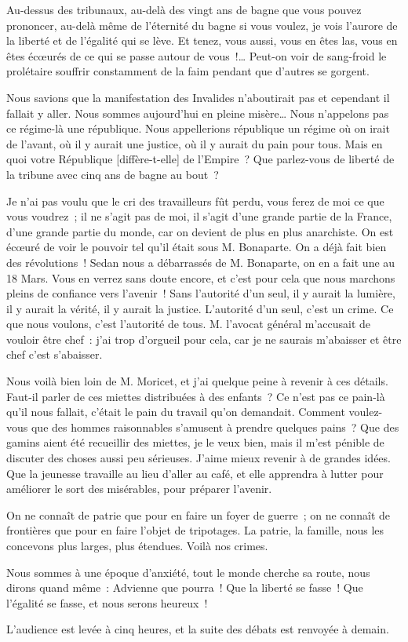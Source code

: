 \documentclass[french,twoside]{book} %
\newcommand\corr[1]{#1}
\begin{document}
Au-dessus des tribunaux, au-delà des vingt ans de bagne que vous pouvez prononcer, au-delà même de l’éternité du bagne si vous voulez, je vois l’aurore de la liberté et de l’égalité qui se lève. Et tenez, vous aussi, vous en êtes las, vous en êtes écœurés de ce qui se passe autour de vous !… Peut-on voir de sang-froid le prolétaire souffrir constamment de la faim pendant que d’autres se gorgent.\par
Nous savions que la manifestation des Invalides n’aboutirait pas et cependant il fallait y aller. Nous sommes aujourd’hui en pleine misère… Nous n’appelons pas ce régime-là une république. Nous appellerions république un régime où on irait de l’avant, où il y aurait une justice, où il y aurait du pain pour tous. Mais en quoi votre République [{\corr diffère-t-elle}] de l’Empire ? Que parlez-vous de liberté de la tribune avec cinq ans de bagne au bout ?\par
Je n’ai pas voulu que le cri des travailleurs fût perdu, vous ferez de moi ce que vous voudrez ; il ne s’agit pas de moi, il s’agit d’une grande partie de la France, d’une grande partie du monde, car on devient de plus en plus anarchiste. On est écœuré de voir le pouvoir tel qu’il était sous M. Bonaparte. On a déjà fait bien des révolutions ! Sedan nous a débarrassés de M. Bonaparte, on en a fait une au 18 Mars. Vous en verrez sans doute encore, et c’est pour cela que nous marchons pleins de confiance vers l’avenir ! Sans l’autorité d’un seul, il y aurait la lumière, il y aurait la vérité, il y aurait la justice. L’autorité d’un seul, c’est un crime. Ce que nous voulons, c’est l’autorité de tous. M. l’avocat général m’accusait de vouloir être chef : j’ai trop d’orgueil pour cela, car je ne saurais m’abaisser et être chef c’est s’abaisser.\par
 Nous voilà bien loin de M. Moricet, et j’ai quelque peine à revenir à ces détails. Faut-il parler de ces miettes distribuées à des enfants ? Ce n’est pas ce pain-là qu’il nous fallait, c’était le pain du travail qu’on demandait. Comment voulez-vous que des hommes raisonnables s’amusent à prendre quelques pains ? Que des gamins aient été recueillir des miettes, je le veux bien, mais il m’est pénible de discuter des choses aussi peu sérieuses. J’aime mieux revenir à de grandes idées. Que la jeunesse travaille au lieu d’aller au café, et elle apprendra à lutter pour améliorer le sort des misérables, pour préparer l’avenir.\par
On ne connaît de patrie que pour en faire un foyer de guerre ; on ne connaît de frontières que pour en faire l’objet de tripotages. La patrie, la famille, nous les concevons plus larges, plus étendues. Voilà nos crimes.\par
Nous sommes à une époque d’anxiété, tout le monde cherche sa route, nous dirons quand même : Advienne que pourra ! Que la liberté se fasse ! Que l’égalité se fasse, et nous serons heureux !\par
\bigbreak
\noindent L’audience est levée à cinq heures, et la suite des débats est renvoyée à demain.\par
\end{document}
